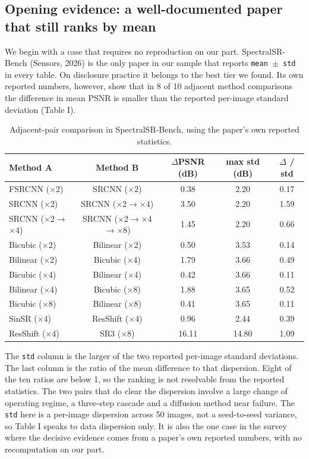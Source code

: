\documentclass[journal,twoside,10pt]{IEEEtran}
\newlength{\tblavail}
\begin{document}
\subsection{Opening evidence: a well-documented paper that still ranks by mean}


We begin with a case that requires no reproduction on our part. SpectralSR-Bench (Sensors, 2026) is the only paper in our sample that reports \texttt{mean $\pm$ std} in every table. On disclosure practice it belongs to the best tier we found. Its own reported numbers, however, show that in 8 of 10 adjacent method comparisons the difference in mean PSNR is smaller than the reported per-image standard deviation (Table I).

\begin{table}[!t]
\caption{Adjacent-pair comparison in SpectralSR-Bench, using the paper's own reported statistics.}
\label{tab:I}
\centering
\small
\setlength{\tabcolsep}{3pt}
\setlength{\tblavail}{\dimexpr\textwidth-10\tabcolsep\relax}
\begin{tabular}{lcccc}
\hline
Method A & Method B & $\Delta$PSNR (dB) & max std (dB) & $\Delta$ / std \\
\hline
FSRCNN ($\times$2) & SRCNN ($\times$2) & 0.38 & 2.20 & 0.17 \\
SRCNN ($\times$2) & SRCNN ($\times$2$\rightarrow$$\times$4) & 3.50 & 2.20 & 1.59 \\
SRCNN ($\times$2$\rightarrow$$\times$4) & SRCNN ($\times$2$\rightarrow$$\times$4$\rightarrow$$\times$8) & 1.45 & 2.20 & 0.66 \\
Bicubic ($\times$2) & Bilinear ($\times$2) & 0.50 & 3.53 & 0.14 \\
Bilinear ($\times$2) & Bicubic ($\times$4) & 1.79 & 3.66 & 0.49 \\
Bicubic ($\times$4) & Bilinear ($\times$4) & 0.42 & 3.66 & 0.11 \\
Bilinear ($\times$4) & Bicubic ($\times$8) & 1.88 & 3.65 & 0.52 \\
Bicubic ($\times$8) & Bilinear ($\times$8) & 0.41 & 3.65 & 0.11 \\
SinSR ($\times$4) & ResShift ($\times$4) & 0.96 & 2.44 & 0.39 \\
ResShift ($\times$4) & SR3 ($\times$8) & 16.11 & 14.80 & 1.09 \\
\hline
\end{tabular}
\end{table}

The \texttt{std} column is the larger of the two reported per-image standard deviations. The last column is the ratio of the mean difference to that dispersion. Eight of the ten ratios are below 1, so the ranking is not resolvable from the reported statistics. The two pairs that do clear the dispersion involve a large change of operating regime, a three-step cascade and a diffusion method near failure. The \texttt{std} here is a per-image dispersion across 50 images, not a seed-to-seed variance, so Table I speaks to data dispersion only. It is also the one case in the survey where the decisive evidence comes from a paper's own reported numbers, with no recomputation on our part.
\end{document}
